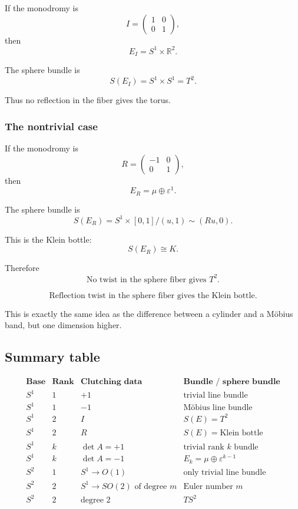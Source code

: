\documentclass[12pt,a4paper]{article}
\theoremstyle{notespace}
\begin{document}
If the monodromy is
\[
I=
\begin{pmatrix}
	1&0\\
	0&1
\end{pmatrix},
\]
then
\[
E_I=S^1\times \mathbb{R}^2.
\]

The sphere bundle is
\[
S(E_I)=S^1\times S^1=T^2.
\]

Thus no reflection in the fiber gives the torus.

\subsubsection*{The nontrivial case}

If the monodromy is
\[
R=
\begin{pmatrix}
	-1&0\\
	0&1
\end{pmatrix},
\]
then
\[
E_R=\mu\oplus \varepsilon^1.
\]

The sphere bundle is
\[
S(E_R)=S^1\times [0,1]/(u,1)\sim(Ru,0).
\]

This is the Klein bottle:
\[
S(E_R)\cong K.
\]

Therefore
\[
\boxed{
	\text{No twist in the sphere fiber gives }T^2.
}
\]

\[
\boxed{
	\text{Reflection twist in the sphere fiber gives the Klein bottle.}
}
\]

This is exactly the same idea as the difference between a cylinder and a M\"obius band, but one dimension higher.

\subsection{Summary table}

\[
\renewcommand{\arraystretch}{1.5}
\begin{array}{c|c|c|c}
	\textbf{Base} & \textbf{Rank} & \textbf{Clutching data} & \textbf{Bundle / sphere bundle} \\
	\hline
	S^1
	&
	1
	&
	+1
	&
	\text{trivial line bundle}
	\\
	\hline
	S^1
	&
	1
	&
	-1
	&
	\text{M\"obius line bundle}
	\\
	\hline
	S^1
	&
	2
	&
	I
	&
	S(E)=T^2
	\\
	\hline
	S^1
	&
	2
	&
	R
	&
	S(E)=\text{Klein bottle}
	\\
	\hline
	S^1
	&
	k
	&
	\det A=+1
	&
	\text{trivial rank }k\text{ bundle}
	\\
	\hline
	S^1
	&
	k
	&
	\det A=-1
	&
	E_k=\mu\oplus\varepsilon^{k-1}
	\\
	\hline
	S^2
	&
	1
	&
	S^1\to O(1)
	&
	\text{only trivial line bundle}
	\\
	\hline
	S^2
	&
	2
	&
	S^1\to SO(2)\text{ of degree }m
	&
	\text{Euler number }m
	\\
	\hline
	S^2
	&
	2
	&
	\text{degree }2
	&
	TS^2
\end{array}
\]
\end{document}
